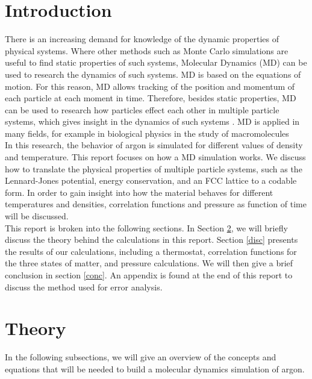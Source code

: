 \documentclass{article}
\begin{document}
\begin{multicols}{2}

\section{Introduction}

There is an increasing demand for knowledge of the dynamic properties of physical systems.  Where other methods such as Monte Carlo simulations are useful to find static properties of such systems, Molecular Dynamics (MD) can be used to research the dynamics of such systems.  MD is based on the equations of motion.  For this reason, MD allows tracking of the position and momentum of each particle at each moment in time.  Therefore, besides static properties, MD can be used to research how particles effect each other in multiple particle systems, which gives insight in the dynamics of such systems \cite{thijssen}.  MD is applied in many fields, for example in biological physics in the study of macromolecules \cite{deGroot} \\

In this research, the behavior of argon is simulated for different values of density and temperature.  This report focuses on how a MD simulation works.  We discuss how to translate the physical properties of multiple particle systems, such as the Lennard-Jones potential, energy conservation, and an FCC lattice to a codable form. In order to gain insight into how the material behaves for different temperatures and densities, correlation functions and pressure as function of time will be discussed. \\

This report is broken into the following sections.  In Section \ref{theory}, we will briefly discuss the theory behind the calculations in this report.  Section \ref{disc} presents the results of our calculations, including a thermostat, correlation functions for the three states of matter, and pressure calculations.  We will then give a brief conclusion in section \ref{conc}.  An appendix is found at the end of this report to discuss the method used for error analysis.  

\section{Theory}
\label{theory}

In the following subsections, we will give an overview of the concepts and equations that will be needed to build a molecular dynamics simulation of argon.


\end{multicols}
\end{document}

